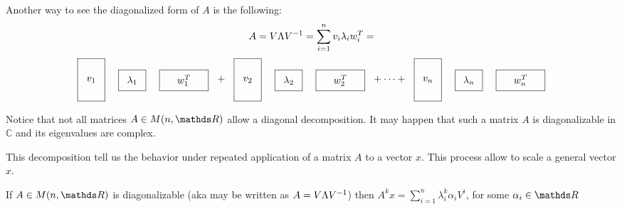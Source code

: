 \documentclass[ComputationalMathematics.tex]{subfiles}
\begin{document}
Another way to see the diagonalized form of $A$ is the following:
\[
  A = V \Lambda {V}^{-1} = \sum\limits_{i=1}^{n} v_i\lambda_i w_i^T = 
\]
\[
  \tallthin{$v_1$} \real{$\lambda_1$} \shortlarge{$w_1^T$} + \tallthin{$v_2$} \real{$\lambda_2$} \shortlarge{$w_2^T$} + \cdots + \tallthin{$v_n$} \real{$\lambda_n$} \shortlarge{$w_n^T$}
\]


Notice that not all matrices $A \in M(n, \R)$ allow a diagonal decomposition.
It may happen that such a matrix $A$ is diagonalizable in $\mathds{C}$ and its eigenvalues are complex.

\noindent This decomposition tell us the behavior under repeated application of a matrix $A$ to a vector $x$. This process allow to scale a general vector $x$.\\


\begin{proposition}
  If $A \in M(n, \R)$ is diagonalizable (aka may be written as $A = V \Lambda {V}^{-1}$) then $A^k x = \sum\limits_{i=1}^{n} \lambda_i^k \alpha_i V^i$, for some $\alpha_i \in \R$
\end{proposition}
\end{document}
